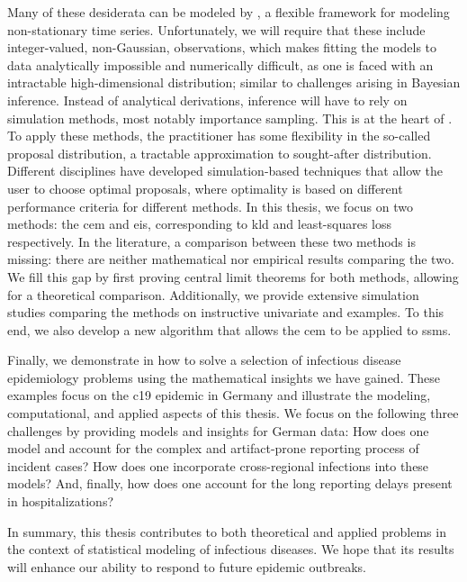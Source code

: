 Many of these desiderata can be modeled by , a flexible framework for modeling non-stationary time series. Unfortunately, we will require that these  include integer-valued, non-Gaussian, observations, which makes fitting the models to data analytically impossible and numerically difficult, as one is faced with an intractable high-dimensional distribution; similar to challenges arising in Bayesian inference. Instead of analytical derivations, inference will have to rely on simulation methods, most notably importance sampling. This is at the heart of . To apply these methods, the practitioner has some flexibility in the so-called proposal distribution, a tractable approximation to sought-after distribution. Different disciplines have developed simulation-based techniques that allow the user to choose optimal proposals, where optimality is based on different performance criteria for different methods. In this thesis, we focus on two methods: the \gls{cem} and \gls{eis}, corresponding to \acrlong{kld} and least-squares loss respectively. In the literature, a comparison between these two methods is missing: there are neither mathematical nor empirical results comparing the two. We fill this gap by first proving central limit theorems for both methods, allowing for a theoretical comparison. Additionally, we provide extensive simulation studies comparing the methods on instructive univariate and  examples. To this end, we also develop a new algorithm that allows the \acrshort{cem} to be applied to \glspl{ssm}. 

Finally, we demonstrate in  how to solve a selection of infectious disease epidemiology problems using the mathematical insights we have gained. These examples focus on the \acrshort{c19} epidemic in Germany and illustrate the modeling, computational, and applied aspects of this thesis. We focus on the following three challenges by providing models and insights for German data: How does one model and account for the complex and artifact-prone reporting process of incident cases? How does one incorporate cross-regional infections into these models? And, finally, how does one account for the long reporting delays present in hospitalizations?

In summary, this thesis contributes to both theoretical and applied problems in the context of statistical modeling of infectious diseases. 
We hope that its results will enhance our ability to respond to future epidemic outbreaks.